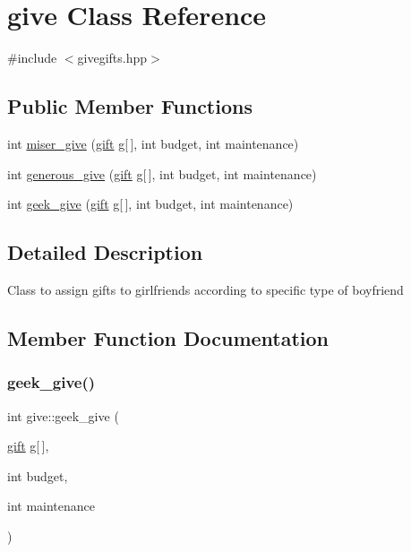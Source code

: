 \hypertarget{classgive}{}\section{give Class Reference}
\label{classgive}


{\ttfamily \#include $<$givegifts.\+hpp$>$}

\subsection*{Public Member Functions}
\begin{DoxyCompactItemize}
\item 
int \hyperlink{classgive_a21ae8c333d4a779cf4ac2a36655b0461}{miser\+\_\+give} (\hyperlink{classgift}{gift} g\mbox{[}$\,$\mbox{]}, int budget, int maintenance)
\item 
int \hyperlink{classgive_a1089b321ade4334159db94d7b91bb957}{generous\+\_\+give} (\hyperlink{classgift}{gift} g\mbox{[}$\,$\mbox{]}, int budget, int maintenance)
\item 
int \hyperlink{classgive_a9ad787bee79cfb0b3357f7440b9dca95}{geek\+\_\+give} (\hyperlink{classgift}{gift} g\mbox{[}$\,$\mbox{]}, int budget, int maintenance)
\end{DoxyCompactItemize}


\subsection{Detailed Description}
Class to assign gifts to girlfriends according to specific type of boyfriend 

\subsection{Member Function Documentation}
\mbox{\label{classgive_a9ad787bee79cfb0b3357f7440b9dca95}} 
\subsubsection{\texorpdfstring{geek\+\_\+give()}{geek\_give()}}
{\footnotesize\ttfamily int give\+::geek\+\_\+give (\begin{DoxyParamCaption}\item[{\hyperlink{classgift}{gift}}]{g\mbox{[}$\,$\mbox{]},  }\item[{int}]{budget,  }\item[{int}]{maintenance }\end{DoxyParamCaption})}

